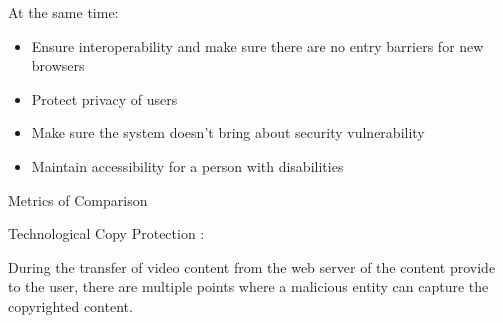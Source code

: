 At the same time:

\begin{itemize}
\tightlist
\item
  Ensure interoperability and make sure there are no entry barriers for
  new browsers
\item
  Protect privacy of users
\item
  Make sure the system doesn't bring about security vulnerability
\item
  Maintain accessibility for a person with disabilities
\end{itemize}

\protect\hypertarget{anchor-3}{}{}Metrics of Comparison

\protect\hypertarget{anchor-4}{}{}Technological Copy Protection :

During the transfer of video content from the web server of the content
provide to the user, there are multiple points where a malicious entity
can capture the copyrighted content.

